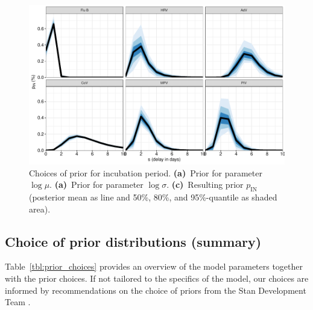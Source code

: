 \documentclass[fleqn,11pt]{wlscirep_supp}
\begin{document}
\begin{figure}[!htpb]
    \centering
    \includegraphics{../../results/epi-data/incubation-periods.pdf}
    \caption[Choices of prior for incubation period]{Choices of prior for incubation period. \textbf{(a)}~Prior for parameter $\log \mu$. \textbf{(a)}~Prior for parameter $\log \sigma$. \textbf{(c)}~Resulting prior $p_\text{IN}$ (posterior mean as line and 50\%, 80\%, and 95\%-quantile as shaded area).}
    \label{fig:prior-pin}
\end{figure}

\subsection{Choice of prior distributions (summary)}

Table~\ref{tbl:prior_choices} provides an overview of the model parameters together with the prior choices. If not tailored to the specifics of the model, our choices are  informed by recommendations on the choice of priors from the Stan Development Team \cite{Stan2020Priors}. 
\end{document}
